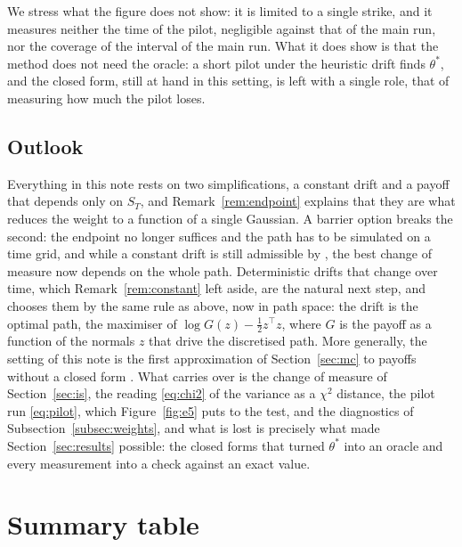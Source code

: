 \documentclass[11pt,a4paper]{article}
\theoremstyle{plain}
\theoremstyle{definition}
\theoremstyle{remark}
\newcommand{\1}{\mathbf{1}}
\newcommand{\VRF}{\mathrm{VRF}}
\newcommand{\Eff}{\mathrm{Eff}}
\begin{document}
We stress what the figure does not show: it is limited to a single strike, and it measures neither the time of the pilot, negligible against that of the main run, nor the coverage of the interval of the main run. What it does show is that the method does not need the oracle: a short pilot under the heuristic drift finds $\theta^*$, and the closed form, still at hand in this setting, is left with a single role, that of measuring how much the pilot loses.

\subsection{Outlook}
\label{subsec:outlook}

Everything in this note rests on two simplifications, a constant drift and a payoff that depends only on $S_T$, and Remark~\ref{rem:endpoint} explains that they are what reduces the weight to a function of a single Gaussian. A barrier option breaks the second: the endpoint no longer suffices and the path has to be simulated on a time grid, and while a constant drift is still admissible by \cite[Thm~4.20]{tfg}, the best change of measure now depends on the whole path. Deterministic drifts that change over time, which Remark~\ref{rem:constant} left aside, are the natural next step, and \cite[\S 4.6.2]{glasserman} chooses them by the same rule as above, now in path space: the drift is the optimal path, the maximiser of $\log G(z) - \frac12 z^\top z$, where $G$ is the payoff as a function of the normals $z$ that drive the discretised path. More generally, the setting of this note is the first approximation of Section~\ref{sec:mc} to payoffs without a closed form \cite[\S 6.3]{tfg}. What carries over is the change of measure of Section~\ref{sec:is}, the reading \eqref{eq:chi2} of the variance as a $\chi^2$ distance, the pilot run \eqref{eq:pilot}, which Figure~\ref{fig:e5} puts to the test, and the diagnostics of Subsection~\ref{subsec:weights}, and what is lost is precisely what made Section~\ref{sec:results} possible: the closed forms that turned $\theta^*$ into an oracle and every measurement into a check against an exact value.

\clearpage
\appendix

\section{Summary table}
\label{app:table}

\begin{table}[h!]
\centering
\caption{Summary at $n = 10^6$: exact price $V$, estimate with the half-width of the $95\%$ interval \eqref{eq:ci}, variance reduction factor estimated by \eqref{eq:vrf-hat}, relative cost $c$ and efficiency $\Eff = \VRF/c$ \eqref{eq:eff}. The costs are times measured on a laptop with an Intel Core i5-1135G7 processor under Windows (median of five runs from $Z$ to the result), and they, and with them the efficiencies, change slightly from run to run, while the rest of the table is reproducible.}
\label{tab:e4}
\medskip

\end{table}
\end{document}
